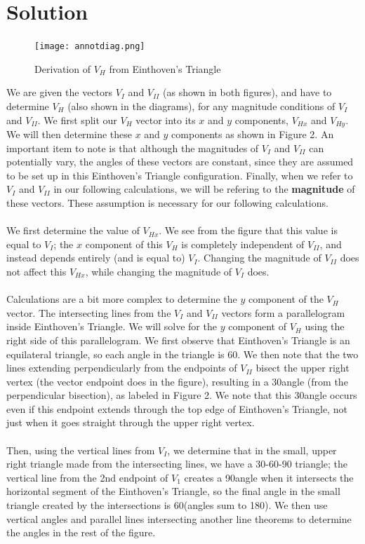 \documentclass[12pt, a4paper]{article}
\begin{document}
\section*{Solution}
\begin{figure}[h]
\caption{Derivation of $V_H$ from Einthoven's Triangle}
\centering
\texttt{[image: annotdiag.png]}
\end{figure}
\noindent We are given the vectors $V_I$ and $V_{II}$ (as shown in both figures), and have to determine $V_H$ (also shown in the diagrams), for any magnitude conditions of $V_I$ and $V_{II}$. We first split our $V_H$ vector into its $x$ and $y$ components, $V_{Hx}$ and $V_{Hy}$. We will then determine these $x$ and $y$ components as shown in Figure 2. An important item to note is that although the magnitudes of $V_I$ and $V_{II}$ can potentially vary, the angles of these vectors are constant, since they are assumed to be set up in this Einthoven's Triangle configuration. Finally, when we refer to $V_I$ and $V_{II}$ in our following calculations, we will be refering to the \textbf{magnitude} of these vectors. These assumption is necessary for our following calculations. \\ \\
We first determine the value of $V_{Hx}$. We see from the figure that this value is equal to $V_I$; the $x$ component of this $V_H$ is completely independent of $V_{II}$, and instead depends entirely (and is equal to) $V_{I}$. Changing the magnitude of $V_{II}$ does not affect this $V_{Hx}$, while changing the magnitude of $V_I$ does. \\ \\
Calculations are a bit more complex to determine the $y$ component of the $V_H$ vector. The intersecting lines from the $V_I$ and $V_{II}$ vectors form a parallelogram inside Einthoven's Triangle. We will solve for the $y$ component of $V_H$ using the right side of this parallelogram. We first observe that Einthoven's Triangle is an equilateral triangle, so each angle in the triangle is 60\degree. We then note that the two lines extending perpendicularly from the endpoints of $V_{II}$ bisect the upper right vertex (the vector endpoint does in the figure), resulting in a 30\degree angle (from the perpendicular bisection), as labeled in Figure 2. We note that this 30\degree angle occurs even if this endpoint extends through the top edge of Einthoven's Triangle, not just when it goes straight through the upper right vertex. \\ \\
Then, using the vertical lines from $V_I$, we determine that in the small, upper right triangle made from the intersecting lines, we have a 30-60-90 \degree triangle; the vertical line from the 2nd endpoint of $V_1$ creates a 90\degree angle when it intersects the horizontal segment of the Einthoven's Triangle, so the final angle in the small triangle created by the intersections is 60\degree (angles sum to 180\degree). We then use vertical angles and parallel lines intersecting another line theorems to determine the angles in the rest of the figure. \\ \\
\end{document}
